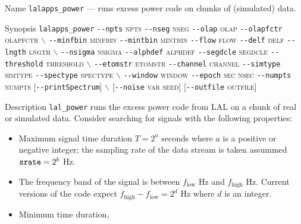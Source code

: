 \begin{entry}

\item[Name]
\verb$lalapps_power$ --- runs excess power code on chunks of (simulated) data.

\item[Synopsis]
\verb$lalapps_power$ \verb$--npts$ \textsc{npts} \verb$--nseg$ \textsc{nseg}
\verb$--olap$ \textsc{olap} \verb$--olapfctr$ \textsc{olapfctr}
$\backslash$ \newline \hspace*{0.25in}
\verb$--minfbin$ \textsc{minfbin} \verb$--mintbin$ \textsc{mintbin} 
\verb$--flow$ \textsc{flow} \verb$--delf$ \textsc{delf} 
\verb$--lngth$ \textsc{lngth} 
$\backslash$ \newline \hspace*{0.25in}
\verb$--nsigma$ \textsc{nsigma}
\verb$--alphdef$ \textsc{alphdef}  \verb$--segdcle$ \textsc{segdcle} 
\verb$--threshold$ \textsc{threshold} 
$\backslash$ \newline \hspace*{0.25in}
\verb$--etomstr$ \textsc{etomstr}
\verb$--channel$ \textsc{channel} \verb$--simtype$ \textsc{simtype} 
\verb$--spectype$ \textsc{spectype} 
$\backslash$ \newline \hspace*{0.25in}
\verb$--window$ \textsc{window} \verb$--epoch$ \textsc{sec} \textsc{nsec} 
\verb$--numpts$ \textsc{numpts} [\verb$--printSpectrum$] 
$\backslash$ \newline \hspace*{0.25in}
[\verb$--noise$ \textsc{var} \textsc{seed}] [\verb$--outfile$ \textsc{outfile}]

\item[Description] 
\verb$lal_power$ runs the excess power code from LAL on a chunk of
real or simulated data.    Consider searching  for signals with the
following properties:
\begin{itemize}
\item Maximum signal time duration $T=2^a$ seconds where $a$ is a
positive or negative integer;  the sampling rate of the data stream is
taken assummed $\mbox{\texttt{srate}} = 2^b$ Hz.

\item The frequency band of the signal is between $f_{\mathrm{low}}$
Hz and ${f_{\mathrm{high}}}$ Hz.  Current versions of the code
expect ${f_{\mathrm{high}}}-{f_{\mathrm{low}}}=2^d$ Hz where
$d$ is an integer. 

\item Minimum time duration,


\end{itemize}
\end{entry}
